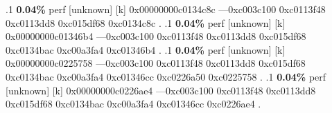 \begin{profile}
{.1 \textbf{ 0.04\%} perf             [unknown]              [k] 0x00000000c0134c8c\newline {} ---0xc003c100\newline {} 0xc0113f48\newline {} 0xc0113dd8\newline {} 0xc015df68\newline {} 0xc0134c8c\newline {} . 
.1 \textbf{ 0.04\%} perf             [unknown]              [k] 0x00000000c01346b4\newline {} ---0xc003c100\newline {} 0xc0113f48\newline {} 0xc0113dd8\newline {} 0xc015df68\newline {} 0xc0134bac\newline {} 0xc00a3fa4\newline {} 0xc01346b4\newline {} . 
.1 \textbf{ 0.04\%} perf             [unknown]              [k] 0x00000000c0225758\newline {} ---0xc003c100\newline {} 0xc0113f48\newline {} 0xc0113dd8\newline {} 0xc015df68\newline {} 0xc0134bac\newline {} 0xc00a3fa4\newline {} 0xc01346cc\newline {} 0xc0226a50\newline {} 0xc0225758\newline {} . 
.1 \textbf{ 0.04\%} perf             [unknown]              [k] 0x00000000c0226ae4\newline {} ---0xc003c100\newline {} 0xc0113f48\newline {} 0xc0113dd8\newline {} 0xc015df68\newline {} 0xc0134bac\newline {} 0xc00a3fa4\newline {} 0xc01346cc\newline {} 0xc0226ae4\newline {} . 
}
\end{profile}
